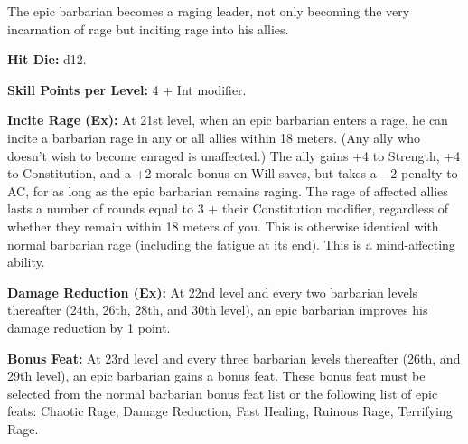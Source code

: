 
The epic barbarian becomes a raging leader, not only becoming the very incarnation of rage but inciting rage into his allies. 

\textbf{Hit Die:} d12.

\textbf{Skill Points per Level:} 4 + Int modifier.

\textbf{Incite Rage (Ex):} At 21st level, when an epic barbarian enters a rage, he can incite a barbarian rage in any or all allies within 18 meters. (Any ally who doesn't wish to become enraged is unaffected.) The ally gains +4 to Strength, +4 to Constitution, and a +2 morale bonus on Will saves, but takes a $-2$ penalty to AC, for as long as the epic barbarian remains raging. The rage of affected allies lasts a number of rounds equal to 3 + their Constitution modifier, regardless of whether they remain within 18 meters of you. This is otherwise identical with normal barbarian rage (including the fatigue at its end). This is a mind-affecting ability.

\textbf{Damage Reduction (Ex):} At 22nd level and every two barbarian levels thereafter (24th, 26th, 28th, and 30th level), an epic barbarian improves his damage reduction by 1 point.

\textbf{Bonus Feat:} At 23rd level and every three barbarian levels thereafter (26th, and 29th level), an epic barbarian gains a bonus feat. These bonus feat must be selected from the normal barbarian bonus feat list or the following list of epic feats:
Chaotic Rage,
Damage Reduction,
Fast Healing,
Ruinous Rage,
Terrifying Rage.

